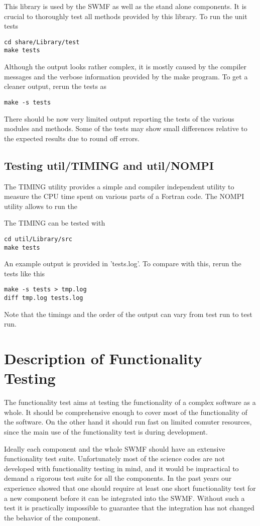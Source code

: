\documentclass[twoside,10pt]{article}
\begin{document}
This library is used by the SWMF as well as the stand alone components.
It is crucial to thoroughly test all methods provided by this library.
To run the unit tests
\begin{verbatim}
cd share/Library/test
make tests
\end{verbatim}
Although the output looks rather complex, it is mostly caused by the
compiler messages and the verbose information provided by the make
program. To get a cleaner output, rerun the tests as
\begin{verbatim}
make -s tests
\end{verbatim}
There should be now very limited output reporting the tests
of the various modules and methods. Some of the tests may show small
differences relative to the expected results due to round off errors.


\subsection{Testing util/TIMING and util/NOMPI}

The TIMING utility provides a simple and compiler independent utility
to measure the CPU time spent on various parts of a Fortran code.
The NOMPI utility allows to run the 

The TIMING can be tested with
\begin{verbatim}
cd util/Library/src
make tests
\end{verbatim}
An example output is provided in 'tests.log'. To compare with this,
rerun the tests like this
\begin{verbatim}
make -s tests > tmp.log
diff tmp.log tests.log
\end{verbatim}
Note that the timings and the order of the output can vary from
test run to test run.

\section{Description of Functionality Testing}

The functionality test aims at testing the functionality of 
a complex software as a whole. It should be comprehensive enough
to cover most of the functionality of the software. On the
other hand it should run fast on limited comuter resources,
since the main use of the functionality test is during development.

Ideally each component and the whole SWMF should have an extensive
functionality test suite. 
Unfortunately most of the science codes are not developed with 
functionality testing in mind, and it would be impractical to demand
a rigorous test suite for all the components. In the past years
our experience showed that one should require at least one short
functionality test for a new component before it can be integrated into
the SWMF. Without such a test it is practically impossible to guarantee
that the integration has not changed the behavior of the component.
\end{document}
